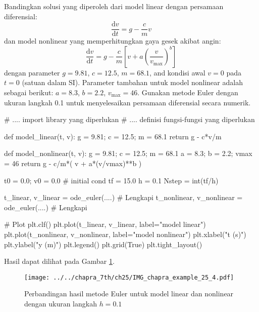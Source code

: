 \begin{soal}
Bandingkan solusi yang diperoleh dari model linear dengan persamaan diferensial:
\begin{equation*}
\frac{\mathrm{d}v}{\mathrm{d}t} = g - \frac{c}{m}v
\end{equation*}
dan model nonlinear yang memperhitungkan gaya gesek akibat angin:
\begin{equation*}
\frac{\mathrm{d}v}{\mathrm{d}t} = g - \frac{c}{m}\left[
v + a\left(\frac{v}{v_{\mathrm{max}}}\right)^b
\right]
\end{equation*}
dengan parameter $g = 9.81$, $c=12.5$, $m=68.1$, and kondisi awal $v=0$ pada $t=0$
(satuan dalam SI).
Parameter tambahan untuk model nonlinear adalah sebagai berikut: $a=8.3$, $b=2.2$,
$v_{\mathrm{max}}=46$.
Gunakan metode Euler dengan ukuran langkah 0.1 untuk menyelesaikan persamaan
diferensial secara numerik.
\end{soal}


\begin{pythoncode}
# .... import library yang diperlukan
# .... definisi fungsi-fungsi yang diperlukan

def model_linear(t, v):
    g = 9.81; c = 12.5; m = 68.1
    return g - c*v/m

def model_nonlinear(t, v):
    g = 9.81; c = 12.5; m = 68.1
    a = 8.3; b = 2.2; vmax = 46
    return g - c/m*( v + a*(v/vmax)**b )
    
t0 = 0.0; v0 = 0.0 # initial cond
tf = 15.0
h = 0.1
Nstep = int(tf/h)

t_linear, v_linear = ode_euler(....) # Lengkapi
t_nonlinear, v_nonlinear = ode_euler(....) # Lengkapi
    
# Plot
plt.clf()
plt.plot(t_linear, v_linear, label="model linear")
plt.plot(t_nonlinear, v_nonlinear, label="model nonlinear")
plt.xlabel("t (s)")
plt.ylabel("y (m)")
plt.legend()
plt.grid(True)
plt.tight_layout()
\end{pythoncode}

Hasil dapat dilihat pada Gambar \ref{fig:example_25_4}.

\begin{figure}[h]
{\centering
\texttt{[image: ../../chapra\_7th/ch25/IMG\_chapra\_example\_25\_4.pdf]}
\par}
\caption{Perbandingan hasil metode Euler untuk model linear dan nonlinear
dengan ukuran langkah $h=0.1$}
\label{fig:example_25_4}
\end{figure}